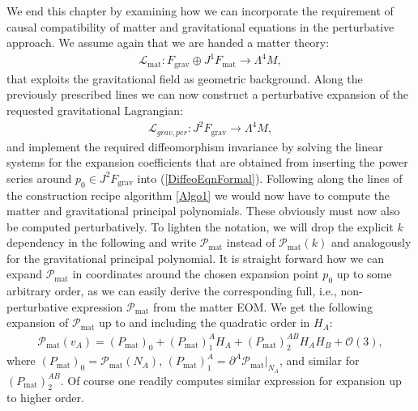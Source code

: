 We end this chapter by examining how we can incorporate the requirement of causal compatibility of matter and gravitational equations in the perturbative approach.
We assume again that we are handed a matter theory: 
\begin{align}
    \mathcal{L}_{\text{mat}} : F_{\text{grav}} \oplus J^1F_{\text{mat}} \longrightarrow \Lambda^4M,
\end{align}
that exploits the gravitational field as geometric background. Along the previously prescribed lines we can now construct a perturbative expansion of the requested gravitational Lagrangian:
\begin{align}
    \mathcal{L}_{grav,per} : J^2F_{\text{grav}} \longrightarrow \Lambda^4M,
\end{align}
and implement the required diffeomorphism invariance by solving the linear systems for the expansion coefficients that are obtained from inserting the power series around $p_0 \in J^2F_{\text{grav}}$ into (\ref{DiffeoEqnFormal}). 
Following along the lines of the construction recipe algorithm \ref{Algo1} we would now have to compute the matter and gravitational principal polynomials.
These obviously must now also be computed perturbatively. 
To lighten the notation, we will drop the explicit $k$ dependency in the following and write $\mathcal{P}_{\text{mat}}$ instead of $\mathcal{P}_{\text{mat}}(k)$ and analogously for the gravitational principal polynomial. It is straight forward how we can expand $\mathcal{P}_{\text{mat}}$ in coordinates around the chosen expansion point $p_0$ up to some arbitrary order, as we can easily derive the corresponding full, i.e., non-perturbative expression $\mathcal{P}_{\text{mat}}$ from the matter EOM. We get the following expansion of $\mathcal{P}_{\text{mat}}$ up to and including the quadratic order in $H_A$:
\begin{align}
    \mathcal{P}_{\text{mat}}(v_A) = (P_{\text{mat}})_{0} + (P_{\text{mat}})^A_1 H_A+ (P_{\text{mat}})^{AB}_2 H_A H_B +\mathcal{O}(3),
\end{align}
where $(P_{\text{mat}})_0 = \mathcal{P}_{\text{mat}}(N_A)$, $(P_{\text{mat}})_1^A = \partial^A \mathcal{P}_{\text{mat}} \vert _{N_A}$, and similar for $(P_{\text{mat}})^{AB}_2$. Of course one readily computes similar expression for expansion up to higher order. 

